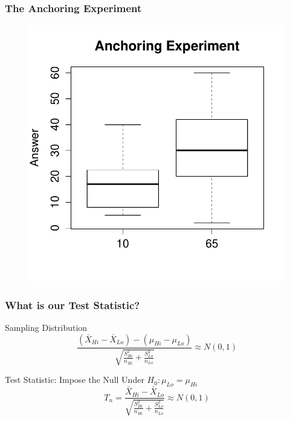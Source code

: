 \documentclass[handout]{beamer}
\begin{document}
\begin{frame}
\frametitle{The Anchoring Experiment}
\begin{figure}
\centering
\includegraphics[scale = 0.55]{./images/anchoring_boxplot}
\end{figure}
\end{frame}
\begin{frame}
\frametitle{What is our Test Statistic?}
\begin{block}{Sampling Distribution}
		$$\frac{\left(\bar{X}_{Hi} - \bar{X}_{Lo}\right) - \left(\mu_{Hi} - \mu_{Lo}\right)}{\sqrt{\frac{S_{Hi}^2}{n_{Hi}} + \frac{S_{Lo}^2}{n_{Lo}}}} \approx N(0,1)$$
\end{block}

\begin{block}{Test Statistic: Impose the Null}
Under $H_0\colon \mu_{Lo} = \mu_{Hi}$
	$$T_n =\frac{\bar{X}_{Hi} - \bar{X}_{Lo}}{\sqrt{\frac{S_{Hi}^2}{n_{Hi}} + \frac{S_{Lo}^2}{n_{Lo}}}} \approx N(0,1)$$
\end{block}
\end{frame}
\end{document}
